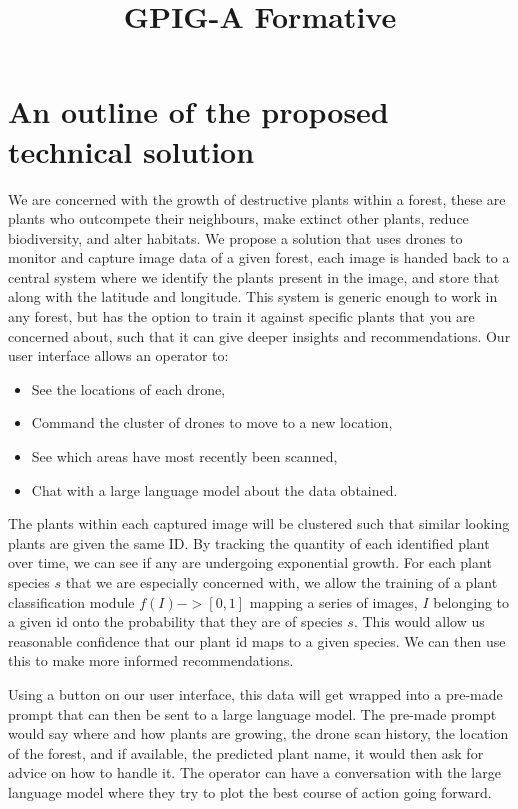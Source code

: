 \documentclass{article}
\title{GPIG-A Formative}
\begin{document}
\maketitle

\section{An outline of the proposed technical solution}

We are concerned with the growth of destructive plants within a forest, these are plants who outcompete their neighbours, make extinct other plants, reduce biodiversity, and alter habitats. 
We propose a solution that uses drones to monitor and capture image data of a given forest, each image is handed back to a central system where we identify the plants present in the image, and store that along with the latitude and longitude.
This system is generic enough to work in any forest, but has the option to train it against specific plants that you are concerned about, such that it can give deeper insights and recommendations.
Our user interface allows an operator to:
\begin{itemize}[noitemsep,topsep=3pt]
\item See the locations of each drone,
\item Command the cluster of drones to move to a new location,
\item See which areas have most recently been scanned,
\item Chat with a large language model about the data obtained.
\end{itemize}


The plants within each captured image will be clustered such that similar looking plants are given the same ID. 
By tracking the quantity of each identified plant over time, we can see if any are undergoing exponential growth.
For each plant species $s$ that we are especially concerned with, we allow the training of a plant classification module $f(I) -> [0,1]$ mapping a series of images, $I$ belonging to a given id onto the probability that they are of species $s$. 
This would allow us reasonable confidence that our plant id maps to a given species.
We can then use this to make more informed recommendations.

Using a button on our user interface, this data will get wrapped into a pre-made prompt that can then be sent to a large language model.
The pre-made prompt would say where and how plants are growing, the drone scan history, the location of the forest, and if available, the predicted plant name, it would then ask for advice on how to handle it.
The operator can have a conversation with the large language model where they try to plot the best course of action going forward.
\end{document}

